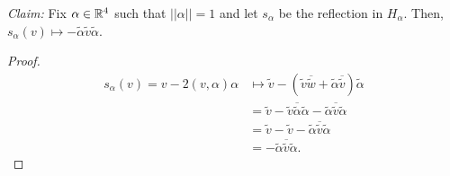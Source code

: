 {\em Claim:} Fix $\alpha \in \mathbb{R}^4$ such that $||\alpha|| = 1$ and let $s_\alpha$
be the reflection in $H_\alpha$. Then, $s_\alpha(v) \mapsto - \tilde{\alpha}
\tilde{v} \tilde{\alpha}$.

\begin{proof}
\begin{align*}
    s_\alpha(v) = v - 2(v, \alpha) \alpha
    & \mapsto \tilde{v} - (\tilde{v} \overline{\tilde{w}} + \tilde{\alpha}
                \overline{\tilde{v}}) \tilde{\alpha} \\
    & = \tilde{v} - \tilde{v} \overline{\tilde{\alpha}} \tilde{\alpha}
        - \tilde{\alpha} \overline{\tilde{v}} \tilde{\alpha} \\
    &= \tilde{v} - \tilde{v} - \tilde{\alpha} \overline{\tilde{v}} \tilde{\alpha} \\
    &= -\tilde{\alpha} \overline{\tilde{v}} \tilde{\alpha}.
\end{align*}
\end{proof}
